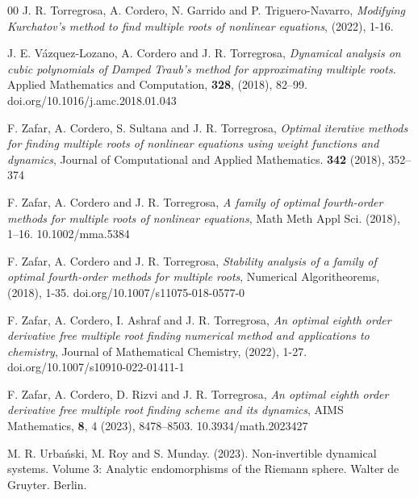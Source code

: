 \documentclass{article}
\theoremstyle{definition}
\theoremstyle{remark}
\begin{document}
\begin{thebibliography}{00}
	 J. R. Torregrosa, A. Cordero, N. Garrido and P. Triguero-Navarro, \emph{Modifying Kurchatov's method to find multiple roots of nonlinear equations}, (2022), 1-16.


	 J. E. Vázquez-Lozano, A. Cordero and J. R. Torregrosa, \emph{Dynamical analysis on cubic polynomials of Damped Traub’s method for approximating multiple roots}. Applied Mathematics and Computation, \textbf{328}, (2018), 82–99. doi.org/10.1016/j.amc.2018.01.043

	 F. Zafar, A. Cordero, S. Sultana and J. R. Torregrosa, \emph{Optimal iterative methods for finding multiple roots of nonlinear equations using weight functions and dynamics}, Journal of Computational and Applied Mathematics. \textbf{342} (2018), 352–374

	 F. Zafar, A. Cordero and J. R. Torregrosa,  \emph{A family of optimal fourth-order methods for multiple roots of nonlinear equations}, Math Meth Appl Sci. (2018), 1–16. 10.1002/mma.5384

	 F. Zafar, A. Cordero and J. R. Torregrosa, \emph{Stability analysis of a family of optimal fourth-order methods for multiple roots}, Numerical Algoritheorems, (2018), 1-35. doi.org/10.1007/s11075-018-0577-0

	 F. Zafar, A. Cordero, I. Ashraf and J. R. Torregrosa, \emph{An optimal eighth order derivative free multiple root finding numerical method and applications to chemistry}, Journal of Mathematical Chemistry, (2022), 1-27. doi.org/10.1007/s10910-022-01411-1

	 F. Zafar, A. Cordero, D. Rizvi and J. R. Torregrosa, \emph{An optimal eighth order derivative free multiple root finding scheme and its dynamics}, AIMS Mathematics, \textbf{8}, 4 (2023), 8478–8503. 10.3934/math.2023427


	 M. R. Urbański, M. Roy and S. Munday. (2023). Non-invertible dynamical systems. Volume 3: Analytic endomorphisms of the Riemann sphere. Walter de Gruyter. Berlin.

\end{thebibliography}
\end{document}

